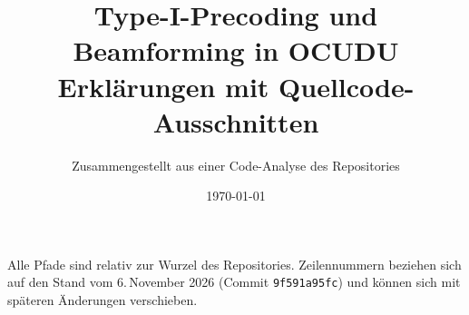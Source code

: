 \documentclass[a4paper,11pt]{article}
\title{Type-I-Precoding und Beamforming in OCUDU\\\large Erklärungen mit Quellcode-Ausschnitten}
\author{Zusammengestellt aus einer Code-Analyse des Repositories}
\date{\today}
\newcommand{\code}[1]{\texttt{#1}}
\begin{document}
\maketitle
\tableofcontents
\bigskip

\noindent Alle Pfade sind relativ zur Wurzel des Repositories. Zeilennummern beziehen sich auf den Stand vom
6.\,November 2026 (Commit \code{9f591a95fc}) und können sich mit späteren Änderungen verschieben.







\end{document}
